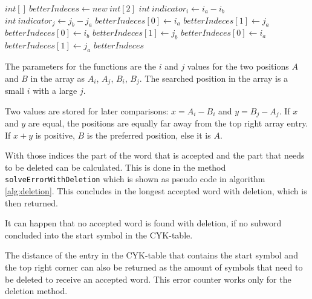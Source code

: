 \documentclass[a4paper, 11pt]{article}
\begin{document}
\begin{center}
	\label{alg:fbi}
	\begin{algorithmic}[1]
		\State $int[] \ betterIndeces \gets new \ int[2]$
		\State $int \  indicator_i \gets i_a - i_b$
		\State $int \ indicator_j \gets j_b - j_a$
		\State {}
		\State $betterIndeces[0] \gets i_a$
		\State $betterIndeces[1] \gets j_a$
		\EndIf
		\State {}
		\State $betterIndeces[0] \gets i_b$
		\State $betterIndeces[1] \gets j_b$
		\Else
		\State {}
		\State $betterIndeces[0] \gets i_a$
		\State $betterIndeces[1] \gets j_a$
		\EndIf
		\State \Return $betterIndeces$
	\end{algorithmic}
	\hrulefill
\end{center}


The parameters for the functions are the $i$ and $j$ values for the two positions $A$ and $B$ in the array as $A_i$, $A_j$, $B_i$, $B_j$. The searched position in the array is a small $i$ with a large $j$.

Two values are stored for later comparisons: $x = A_i - B_i$ and $y = B_j-A_j$. If $x$ and $y$ are equal, the positions are equally far away from the top right array entry. If $x+y$ is positive, $B$ is the preferred position, else it is $A$.


With those indices the part of the word that is accepted and the part that needs to be deleted can be calculated. This is done in the method \texttt{solveErrorWithDeletion} which is shown as pseudo code in algorithm \ref{alg:deletion}. This concludes in the longest accepted word with deletion, which is then returned.

It can happen that no accepted word is found with deletion, if no subword concluded into the start symbol in the CYK-table.

The distance of the entry in the CYK-table that contains the start symbol and the top right corner can also be returned as the amount of symbols that need to be deleted to receive an accepted word. This error counter works only for the deletion method.
\end{document}
